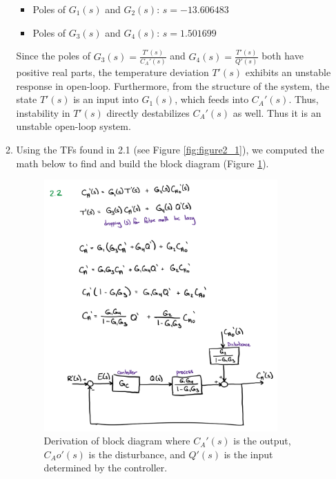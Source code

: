 \documentclass[12pt]{article}
\begin{document}
\begin{enumerate}
\begin{enumerate}
    \begin{itemize}
        \item Poles of \( G_1(s) \) and \( G_2(s) \): \( s = -13.606483 \)
        \item Poles of \( G_3(s) \) and \( G_4(s) \): \( s = 1.501699 \)
    \end{itemize}
    
    Since the poles of \( G_3(s) = \frac{T'(s)}{C_A'(s)} \) and \( G_4(s) = \frac{T'(s)}{Q'(s)} \) both have positive real parts, the temperature deviation \( T'(s) \) exhibits an unstable response in open-loop. Furthermore, from the structure of the system, the state \( T'(s) \) is an input into \( G_1(s) \), which feeds into \( C_A'(s) \). Thus, instability in \( T'(s) \) directly destabilizes \( C_A'(s) \) as well. Thus it is an unstable open-loop system.
    
    \clearpage
    \item Using the TFs found in 2.1 (see Figure \ref{fig:figure2_1}), we computed the math below to find and build the block diagram (Figure \ref{fig:figure2_2}).
    
    \begin{figure}[H]
      \centering
      \includegraphics[width=0.9\textwidth]{Figures/figure2_2.png}
      \caption{Derivation of block diagram where \( C_A'(s) \) is the output, \( C_Ao'(s) \) is the disturbance, and \( Q'(s) \) is the input determined by the controller.}
      \label{fig:figure2_2}
    \end{figure}


\end{enumerate}
\end{enumerate}
\end{document}
